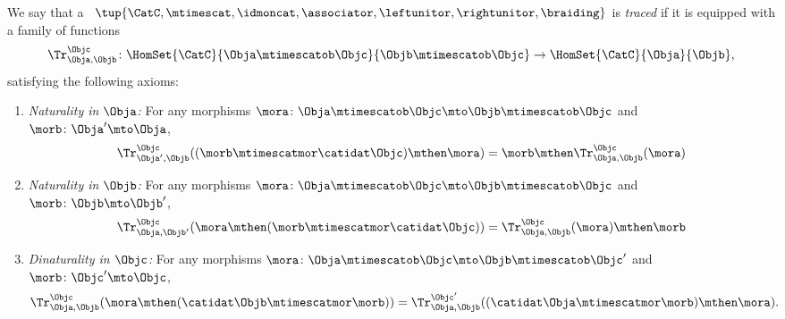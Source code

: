 \begin{ctdefinition}
    \label{def:traced-monoidal-cat}
    \label{def:traced-monoidal-category}
    We say that a ~$\tup{\CatC, \mtimescat, \idmoncat, \associator, \leftunitor, \rightunitor, \braiding}$ is \emph{traced} if it is equipped with a family of functions
    \begin{equation}
        \Tr_{\Obja,\Objb}^\Objc\colon \HomSet{\CatC}{\Obja \mtimescatob \Objc}{\Objb\mtimescatob \Objc}\to \HomSet{\CatC}{\Obja}{\Objb},
    \end{equation}
    satisfying the following axioms:
    \begin{enumerate}
        \item \emph{Naturality in $\Obja$:} For any morphisms $\mora\colon \Obja\mtimescatob \Objc \mto \Objb\mtimescatob \Objc$ and $\morb \colon \Obja' \mto \Obja$,
              \begin{equation}\label{eq:trace-naturality-1}
                  \Tr_{\Obja', \Objb}^\Objc ( (\morb \mtimescatmor \catidat\Objc) \mthen \mora) = \morb \mthen \Tr_{\Obja, \Objb}^\Objc (\mora)
              \end{equation}
        \item \emph{Naturality in $\Objb$:} For any morphisms $\mora\colon \Obja\mtimescatob \Objc \mto \Objb\mtimescatob \Objc$ and $\morb \colon \Objb \mto \Objb'$,
              \begin{equation}\label{eq:trace-naturality-2}
                  \Tr_{\Obja, \Objb'}^\Objc ( \mora \mthen (\morb \mtimescatmor \catidat\Objc) ) = \Tr_{\Obja, \Objb}^\Objc (\mora) \mthen \morb
              \end{equation}
        \item \emph{Dinaturality in $\Objc$:}
              For any morphisms $\mora \colon \Obja \mtimescatob \Objc \mto \Objb \mtimescatob \Objc'$ and $\morb \colon \Objc' \mto \Objc$,
              \begin{equation}\label{eq:trace-dinaturality}
                  \Tr_{\Obja, \Objb}^{\Objc} (\mora \mthen (\catidat\Objb \mtimescatmor \morb)) = \Tr_{\Obja, \Objb}^{\Objc'}((\catidat\Obja \mtimescatmor \morb) \mthen \mora).
              \end{equation}


\end{enumerate}
\end{ctdefinition}
